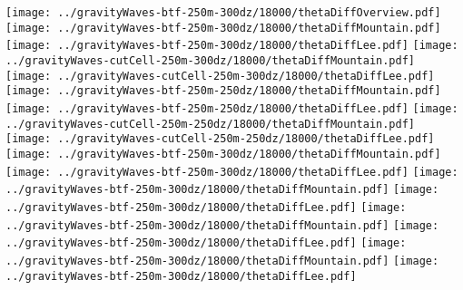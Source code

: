 \documentclass{article}
\begin{document}
\centering
\texttt{[image: ../gravityWaves-btf-250m-300dz/18000/thetaDiffOverview.pdf]}
\vspace*{0.1in}
\texttt{[image: ../gravityWaves-btf-250m-300dz/18000/thetaDiffMountain.pdf]}
\texttt{[image: ../gravityWaves-btf-250m-300dz/18000/thetaDiffLee.pdf]}
\hspace{0.2in}
\texttt{[image: ../gravityWaves-cutCell-250m-300dz/18000/thetaDiffMountain.pdf]}
\texttt{[image: ../gravityWaves-cutCell-250m-300dz/18000/thetaDiffLee.pdf]}
\vspace*{0.1in}
\texttt{[image: ../gravityWaves-btf-250m-250dz/18000/thetaDiffMountain.pdf]}
\texttt{[image: ../gravityWaves-btf-250m-250dz/18000/thetaDiffLee.pdf]}
\hspace{0.2in}
\texttt{[image: ../gravityWaves-cutCell-250m-250dz/18000/thetaDiffMountain.pdf]}
\texttt{[image: ../gravityWaves-cutCell-250m-250dz/18000/thetaDiffLee.pdf]}
\vspace*{0.1in}
\texttt{[image: ../gravityWaves-btf-250m-300dz/18000/thetaDiffMountain.pdf]}
\texttt{[image: ../gravityWaves-btf-250m-300dz/18000/thetaDiffLee.pdf]}
\hspace{0.2in}
\texttt{[image: ../gravityWaves-btf-250m-300dz/18000/thetaDiffMountain.pdf]}
\texttt{[image: ../gravityWaves-btf-250m-300dz/18000/thetaDiffLee.pdf]}
\vspace*{0.1in}
\texttt{[image: ../gravityWaves-btf-250m-300dz/18000/thetaDiffMountain.pdf]}
\texttt{[image: ../gravityWaves-btf-250m-300dz/18000/thetaDiffLee.pdf]}
\hspace{0.2in}
\texttt{[image: ../gravityWaves-btf-250m-300dz/18000/thetaDiffMountain.pdf]}
\texttt{[image: ../gravityWaves-btf-250m-300dz/18000/thetaDiffLee.pdf]}
\end{document}
